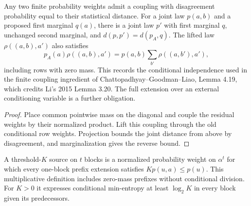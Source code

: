 \begin{theorem}
  \label{thm:lowerbounds-algebraic-weighted-coupling}
  \leanok
  Any two finite probability weights admit a coupling with disagreement
  probability equal to their statistical distance. For a joint law
  $p(a,b)$ and a proposed first marginal $q(a)$, there is a joint law $p'$
  with first marginal $q$, unchanged second marginal, and
  $d(p,p')=d(p_A,q)$. The lifted law $\rho((a,b),a')$ also satisfies
  \[
    p_A(a)\rho((a,b),a')=p(a,b)\sum_{b'}\rho((a,b'),a'),
  \]
  including rows with zero mass. This records the conditional independence
  used in the finite coupling ingredient of Chattopadhyay--Goodman--Liao,
  Lemma 4.19, which credits Li's 2015 Lemma 3.20. The full extension over
  an external conditioning variable is a further obligation.
\end{theorem}
\begin{proof}
  \leanok
  Place common pointwise mass on the diagonal and couple the residual
  weights by their normalized product. Lift this coupling through the old
  conditional row weights. Projection bounds the joint distance from
  above by disagreement, and marginalization gives the reverse bound.
\end{proof}

\begin{definition}
  \label{def:lowerbounds-algebraic-block-source}
  \leanok
  A threshold-$K$ source on $t$ blocks is a normalized probability weight
  on $\alpha^t$ for which every one-block prefix extension satisfies
  $Kp(u,a)\le p(u)$. This multiplicative definition includes zero-mass
  prefixes without conditional division. For $K>0$ it expresses conditional
  min-entropy at least $\log_2K$ in every block given its predecessors.
\end{definition}

